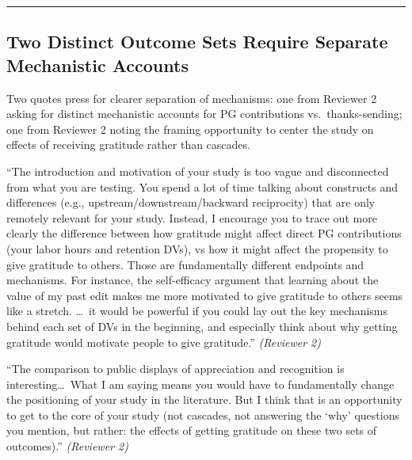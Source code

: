 \documentclass[12pt]{article}
\newenvironment{reviewquote}{%
  \def\FrameCommand{{\color{quotebarcolor}\vrule width 2pt}\colorbox{quotebg}}%
  \MakeFramed{\advance\hsize-\width \FrameRestore}%
  \small
}{%
  \endMakeFramed
}
\newcommand{\sectionnote}[1]{\par\smallskip#1\par\medskip}
\begin{document}
\bigskip\hrule\bigskip

\subsection{Two Distinct Outcome Sets Require Separate Mechanistic Accounts}

\sectionnote{Two quotes press for clearer separation of mechanisms: one from Reviewer 2 asking for distinct mechanistic accounts for PG contributions vs.\ thanks-sending; one from Reviewer 2 noting the framing opportunity to center the study on effects of receiving gratitude rather than cascades.}

\begin{reviewquote}
``The introduction and motivation of your study is too vague and disconnected from what you are testing. You spend a lot of time talking about constructs and differences (e.g., upstream/downstream/backward reciprocity) that are only remotely relevant for your study. Instead, I encourage you to trace out more clearly the difference between how gratitude might affect direct PG contributions (your labor hours and retention DVs), vs how it might affect the propensity to give gratitude to others. Those are fundamentally different endpoints and mechanisms. For instance, the self-efficacy argument that learning about the value of my past edit makes me more motivated to give gratitude to others seems like a stretch. \ldots\ it would be powerful if you could lay out the key mechanisms behind each set of DVs in the beginning, and especially think about why getting gratitude would motivate people to give gratitude.'' \textit{(Reviewer 2)}
\end{reviewquote}

\begin{reviewquote}
``The comparison to public displays of appreciation and recognition is interesting\ldots\ What I am saying means you would have to fundamentally change the positioning of your study in the literature. But I think that is an opportunity to get to the core of your study (not cascades, not answering the `why' questions you mention, but rather: the effects of getting gratitude on these two sets of outcomes).'' \textit{(Reviewer 2)}
\end{reviewquote}
\end{document}
